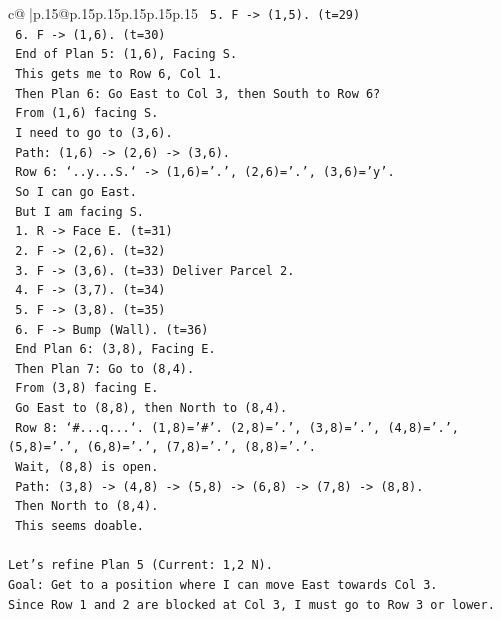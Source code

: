 \documentclass{article}
\begin{document}
{\begin{supertabular}{c@{$\;$}|p{.15\linewidth}@{}p{.15\linewidth}p{.15\linewidth}p{.15\linewidth}p{.15\linewidth}p{.15\linewidth}}
{{{\texttt{   5. F {-}> (1,5). (t=29)} \\
\texttt{   6. F {-}> (1,6). (t=30)} \\
\texttt{   End of Plan 5: (1,6), Facing S.} \\
\texttt{   This gets me to Row 6, Col 1.} \\
\texttt{   Then Plan 6: Go East to Col 3, then South to Row 6?} \\
\texttt{   From (1,6) facing S.} \\
\texttt{   I need to go to (3,6).} \\
\texttt{   Path: (1,6) {-}> (2,6) {-}> (3,6).} \\
\texttt{   Row 6: `..y...S.` {-}> (1,6)='.', (2,6)='.', (3,6)='y'.} \\
\texttt{   So I can go East.} \\
\texttt{   But I am facing S.} \\
\texttt{   1. R {-}> Face E. (t=31)} \\
\texttt{   2. F {-}> (2,6). (t=32)} \\
\texttt{   3. F {-}> (3,6). (t=33) Deliver Parcel 2.} \\
\texttt{   4. F {-}> (3,7). (t=34)} \\
\texttt{   5. F {-}> (3,8). (t=35)} \\
\texttt{   6. F {-}> Bump (Wall). (t=36)} \\
\texttt{   End Plan 6: (3,8), Facing E.} \\
\texttt{   Then Plan 7: Go to (8,4).} \\
\texttt{   From (3,8) facing E.} \\
\texttt{   Go East to (8,8), then North to (8,4).} \\
\texttt{   Row 8: `\#...q...`. (1,8)='\#'. (2,8)='.', (3,8)='.', (4,8)='.', (5,8)='.', (6,8)='.', (7,8)='.', (8,8)='.'.} \\
\texttt{   Wait, (8,8) is open.} \\
\texttt{   Path: (3,8) {-}> (4,8) {-}> (5,8) {-}> (6,8) {-}> (7,8) {-}> (8,8).} \\
\texttt{   Then North to (8,4).} \\
\texttt{   This seems doable.} \\
\\ 
\texttt{Let's refine Plan 5 (Current: 1,2 N).} \\
\texttt{Goal: Get to a position where I can move East towards Col 3.} \\
\texttt{Since Row 1 and 2 are blocked at Col 3, I must go to Row 3 or lower.} \\
}}}
\end{supertabular}}
\end{document}
